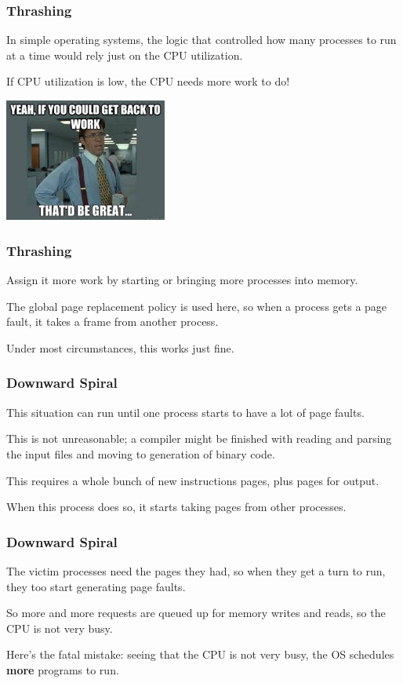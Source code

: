 \begin{frame}
\frametitle{Thrashing}

In simple operating systems, the logic that controlled how many processes to run at a time would rely just on the CPU utilization. 

If CPU utilization is low, the CPU needs more work to do! 

\begin{center}
	\includegraphics[width=0.4\textwidth]{images/backtowork.jpg}
\end{center}

\end{frame}

\begin{frame}
\frametitle{Thrashing}

Assign it more work by starting or bringing more processes into memory. 

The global page replacement policy is used here, so when a process gets a page fault, it takes a frame from another process. 

Under most circumstances, this works just fine.

\end{frame}

\begin{frame}
\frametitle{Downward Spiral}

This situation can run until one process starts to have a lot of page faults. 

This is not unreasonable; a compiler might be finished with reading and parsing the input files and moving to generation of binary code. 

This requires a whole bunch of new instructions pages, plus pages for output. 

When this process does so, it starts taking pages from other processes.

\end{frame}

\begin{frame}
\frametitle{Downward Spiral}

The victim processes need the pages they had, so when they get a turn to run, they too start generating page faults. 

So more and more requests are queued up for memory writes and reads, so the CPU is not very busy. 

Here's the fatal mistake: seeing that the CPU is not very busy, the OS schedules \textbf{more} programs to run.  

\end{frame}

